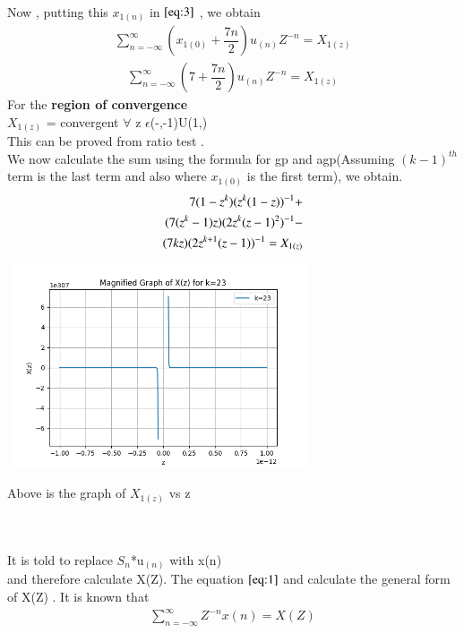 \documentclass[journal,12pt,twocolumn]{IEEEtran}
\theoremstyle{remark}
\begin{document}
\begin{enumerate}
\\Now , putting this $x_{1(n)}$ in $\eqref{eq:3}$ , we obtain \\
\begin{align}
     \sum_{n=-\infty}^{\infty}(x_{1(0)} + \dfrac{7n}{2})u_{(n)}Z^{-n} =X_{1(z)}
\end{align}
\begin{align}
\sum_{n=-\infty}^{\infty}(7 + \dfrac{7n}{2})u_{(n)}Z^{-n} =X_{1(z)}
\end{align}
For the \textbf{region of convergence}\\
$X_{1(z)}$ = convergent $\forall$ z $\epsilon$(-\infty,-1)U(1,\infty)
\\

This can be proved from ratio test . \\
We now calculate the sum using the formula for gp and agp(Assuming $(k-1)^{th}$ term is the last term and also where $x_{1(0)}$ is the first term), we obtain.\\

\begin{align}
   \notag 7(1-z^k)(z^k(1-z))^{-1}+
   \\ \notag(7(z^k-1)z)(2z^k(z-1)^2)^{-1}-\\ (7kz)(2z^{k+1}(z-1))^{-1}=X_{1(z)}
\end{align}
\graphicspath{ {figs/} }
\includegraphics[width=9cm, height=6cm]{Figure_2}
\caption{Above is the graph of $X_{1(z)}$ vs z}\\
\label{graph:2}
\\

It is told to replace $S_n$*u$_{(n)}$ with x(n) \\and therefore calculate X(Z). The equation $\eqref{eq:1}$ and calculate the general form of X(Z) .
It is known that\\
\begin{align}
 \sum_{n=-\infty}^{\infty} Z^{-n}x(n) = X(Z)\label{eq:3}
 \end{align}


\end{enumerate}
\end{document}
